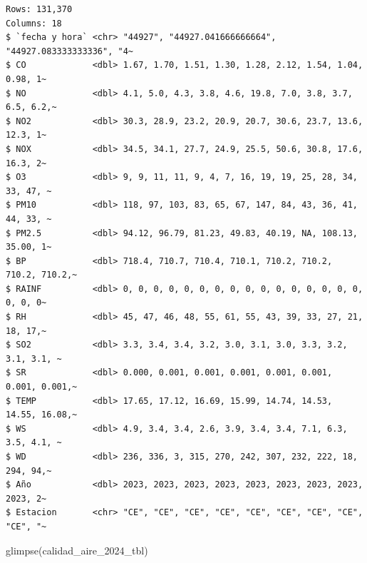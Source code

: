\documentclass[
  letterpaper,
  DIV=11,
  numbers=noendperiod]{scrartcl}
\newenvironment{Shaded}{\begin{snugshade}}{\end{snugshade}}
\newcommand{\FunctionTok}[1]{\textcolor[rgb]{0.28,0.35,0.67}{#1}}
\newcommand{\NormalTok}[1]{\textcolor[rgb]{0.00,0.23,0.31}{#1}}
\begin{document}
\begin{verbatim}
Rows: 131,370
Columns: 18
$ `fecha y hora` <chr> "44927", "44927.041666666664", "44927.083333333336", "4~
$ CO             <dbl> 1.67, 1.70, 1.51, 1.30, 1.28, 2.12, 1.54, 1.04, 0.98, 1~
$ NO             <dbl> 4.1, 5.0, 4.3, 3.8, 4.6, 19.8, 7.0, 3.8, 3.7, 6.5, 6.2,~
$ NO2            <dbl> 30.3, 28.9, 23.2, 20.9, 20.7, 30.6, 23.7, 13.6, 12.3, 1~
$ NOX            <dbl> 34.5, 34.1, 27.7, 24.9, 25.5, 50.6, 30.8, 17.6, 16.3, 2~
$ O3             <dbl> 9, 9, 11, 11, 9, 4, 7, 16, 19, 19, 25, 28, 34, 33, 47, ~
$ PM10           <dbl> 118, 97, 103, 83, 65, 67, 147, 84, 43, 36, 41, 44, 33, ~
$ PM2.5          <dbl> 94.12, 96.79, 81.23, 49.83, 40.19, NA, 108.13, 35.00, 1~
$ BP             <dbl> 718.4, 710.7, 710.4, 710.1, 710.2, 710.2, 710.2, 710.2,~
$ RAINF          <dbl> 0, 0, 0, 0, 0, 0, 0, 0, 0, 0, 0, 0, 0, 0, 0, 0, 0, 0, 0~
$ RH             <dbl> 45, 47, 46, 48, 55, 61, 55, 43, 39, 33, 27, 21, 18, 17,~
$ SO2            <dbl> 3.3, 3.4, 3.4, 3.2, 3.0, 3.1, 3.0, 3.3, 3.2, 3.1, 3.1, ~
$ SR             <dbl> 0.000, 0.001, 0.001, 0.001, 0.001, 0.001, 0.001, 0.001,~
$ TEMP           <dbl> 17.65, 17.12, 16.69, 15.99, 14.74, 14.53, 14.55, 16.08,~
$ WS             <dbl> 4.9, 3.4, 3.4, 2.6, 3.9, 3.4, 3.4, 7.1, 6.3, 3.5, 4.1, ~
$ WD             <dbl> 236, 336, 3, 315, 270, 242, 307, 232, 222, 18, 294, 94,~
$ Año            <dbl> 2023, 2023, 2023, 2023, 2023, 2023, 2023, 2023, 2023, 2~
$ Estacion       <chr> "CE", "CE", "CE", "CE", "CE", "CE", "CE", "CE", "CE", "~
\end{verbatim}

\begin{Shaded}
\begin{Highlighting}[]
\FunctionTok{glimpse}\NormalTok{(calidad\_aire\_2024\_tbl)}
\end{Highlighting}
\end{Shaded}
\end{document}
